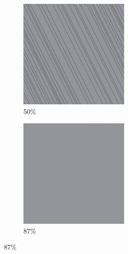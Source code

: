 \documentclass[12pt, fleqn]{report}                             %
\theoremstyle{break}                                            %
\begin{document}
\begin{figure}[ht!]
\begin{subfigure}[b]{0.4\linewidth}
          \includegraphics[width=0.6\textwidth]{Images/7/c.png}
          \caption{50\%}
        \end{subfigure}
        \begin{subfigure}[b]{0.4\linewidth}
          \includegraphics[width=0.6\textwidth]{Images/7/d.png}
          \caption{87\%}
        \end{subfigure}
      \end{figure}
\end{document}
